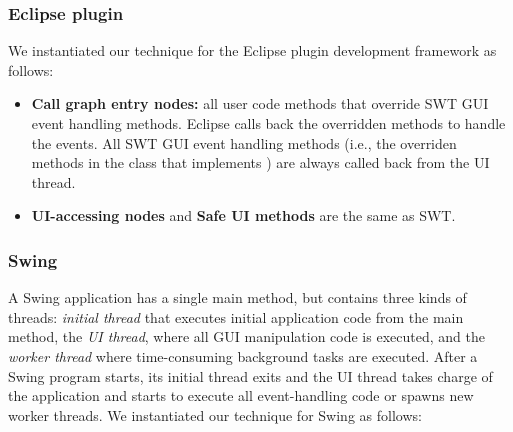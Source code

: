\tinystep
\tinystep
\subsubsection{Eclipse plugin}

We instantiated our technique for the Eclipse plugin development framework as follows:

\smallstep
\begin{myindentpar}{-2mm}

\begin{itemize}

\item \textbf{Call graph entry nodes: } all user code methods that override
 SWT GUI event handling methods. Eclipse
calls back the overridden methods to handle the
events. All SWT GUI event handling methods (i.e., the overriden
methods in the class that implements ) are
always called back from the UI thread.

\tinystep

\item \textbf{UI-accessing nodes} and \textbf{Safe UI methods} are the same as SWT.

\end{itemize}
\end{myindentpar}

\tinystep
\tinystep
\tinystep
\subsubsection{Swing}

A Swing application has a single main method, but contains three kinds of
threads: \textit{initial thread} that executes initial application code from the main method,
the \textit{UI thread}, where all GUI manipulation code is executed,
and the \textit{worker thread} where time-consuming background tasks are executed.
After a Swing program starts, its initial thread exits and the UI thread takes charge
of the application and starts to execute all event-handling code or spawns new worker threads. 
We instantiated our technique for Swing as follows:

